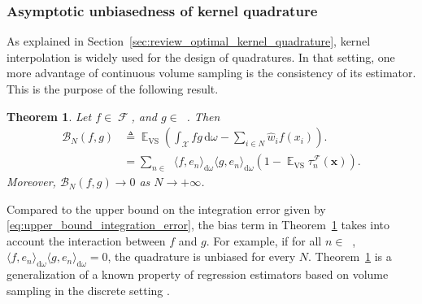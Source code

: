 \documentclass[twoside,11pt]{book}
\newtheorem{theorem}{Theorem}
\DeclareMathOperator{\VS}{\mathrm{VS}}
\DeclareMathOperator{\EX}{\mathbb{E}}
\DeclareMathOperator{\F}{\mathcal{F}}
\DeclareMathOperator{\X}{\mathcal{X}}
\DeclareMathOperator{\Ltwo}{\mathbb{L}_{2}(\mathrm{d} \omega)}
\DeclareMathOperator{\Ns}{\mathbb{N}^{*}}
\newcommand{\pc}[1]{\textcolor{blue}{#1}}
\newcommand{\rb}[1]{\textcolor{magenta}{#1}}
\begin{document}
\subsubsection{Asymptotic unbiasedness of kernel quadrature}\label{sec:unbiased_property}
As explained in Section~\ref{sec:review_optimal_kernel_quadrature}, kernel interpolation is widely used for the design of quadratures.
In that setting, one more advantage of continuous volume sampling is the consistency of its estimator. This is the purpose of the following result.
 \begin{theorem}\label{thm:EX_VS_integration_error}
Let $f \in \F$, and $g \in \Ltwo$. Then
\begin{align}
\mathcal{B}_{N}(f,g) & \triangleq \EX_{\VS} \left( \int_{\X}fg\,\mathrm{d}\omega -  \sum\limits_{i \in N} \hat{w}_{i}f(x_{i}) \right). \nonumber\\
 & = \sum\limits_{n \in \Ns} \langle f,e_{n} \rangle_{\mathrm{d}\omega} \langle g,e_{n} \rangle_{\mathrm{d}\omega}\left(1- \EX_{\VS}\tau_{n}^{\F}(\bm{x}) \right) . %
\end{align}
Moreover,
$\mathcal{B}_{N}(f,g) \rightarrow 0$ as $N \rightarrow +\infty$.
\end{theorem}
Compared to the upper bound on the integration error given by \eqref{eq:upper_bound_integration_error}, the bias term in Theorem~\ref{thm:EX_VS_integration_error} takes into account the interaction between $f$ and $g$. For example, if for all $n \in \Ns$, $\langle f,e_{n} \rangle_{\mathrm{d}\omega} \langle g,e_{n} \rangle_{\mathrm{d}\omega} = 0$, the quadrature is unbiased for every $N$.
Theorem~\ref{thm:EX_VS_integration_error} is a generalization of a known property of regression estimators based on volume sampling in the discrete setting \citep{BeTe90,DeWa17,DeWaHs18,DeWaHs19}.
\end{document}
